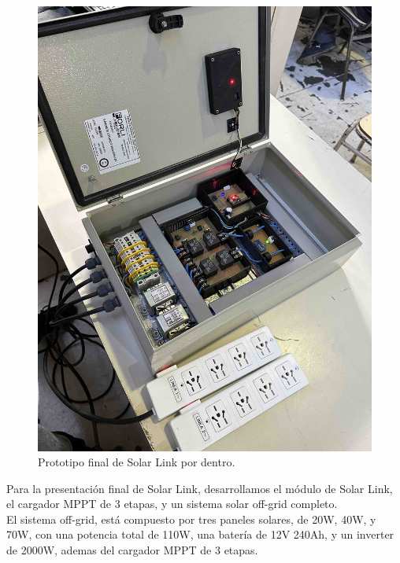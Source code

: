 \begin{figure}[H]
    \centering
    \includegraphics[width=1\linewidth]{proto-final/IMG_9419.jpg}
    \caption{Prototipo final de Solar Link por dentro.}
    \label{fig:final-in}
\end{figure}

Para la presentación final de Solar Link, desarrollamos el módulo de Solar Link, el cargador MPPT de 3 etapas, y un sistema solar off-grid completo.\\

El sistema off-grid, está compuesto por tres paneles solares, de 20W, 40W, y 70W, con una potencia total de 110W, una batería de 12V 240Ah, y un inverter de 2000W, ademas del cargador MPPT de 3 etapas.\\

